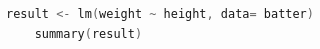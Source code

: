 \begin{lstlisting}[language=c++,label={code:11_04},caption={Executing Regression Analysis}]
    result <- lm(weight ~ height, data= batter)
    summary(result)
\end{lstlisting}
